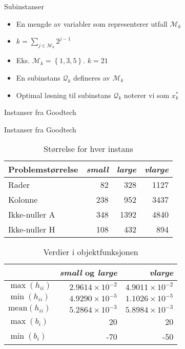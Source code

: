 \documentclass{beamer}
\begin{document}
\begin{frame}{Subinstanser}
\begin{itemize}
\item En mengde av variabler som representerer utfall $\mathcal{M}_k$
\item $k = \sum_{j \in \mathcal{M}_k}^{} 2^{j-1}$
\item Eks. $\mathcal{M}_k = \left\{1,3,5 \right\}$. $k = 21$
\item En subinstans $\mathcal{Q}_k$ defineres av $\mathcal{M}_k$
\item Optimal løsning til subinstans $\mathcal{Q}_k$ noterer vi som $x_k^*$
\end{itemize}
\end{frame}



\begin{frame}{Instanser fra Goodtech}

\end{frame}



\begin{frame}{Instanser fra Goodtech}
\begin{table}[ht!]
    \centering
    \caption{Størrelse for hver instans}
    \begin{tabular}{lrrr}
    Problemstørrelse & \textit{small} & \textit{large} & \textit{vlarge} \\\hline
    Rader        & 82             & 328            & 1127 \\
    Kolonne      & 238            & 952            & 3437 \\
    Ikke-nuller A & 348            & 1392           & 4840 \\
    Ikke-nuller H & 108            & 432            & 894 \\
    \end{tabular}
    \label{table:sizes}
\end{table}
\begin{table}[ht!]
    \centering
    \caption{Verdier i objektfunksjonen}

    \begin{tabular}{lrr}
      & \textit{small} og \textit{large}         & \textit{vlarge} \\\hline
    $\max(h_{ii})$      & $2.9614 \times 10^{-2}$ & $4.9011 \times 10^{-2}$ \\
    $\min(h_{ii})$      & $4.9290 \times 10^{-5}$ & $1.1026 \times 10^{-5}$ \\
$\textrm{mean}(h_{ii})$ & $5.2864 \times 10^{-3}$ & $5.8984 \times 10^{-3}$ \\
    $\max(b_{i})$       & 20                      & 20 \\
    $\min(b_{i})$       & -70                     & -50 \\
    \end{tabular}
    \label{table:maxmin}
\end{table}
\end{frame}
\end{document}
